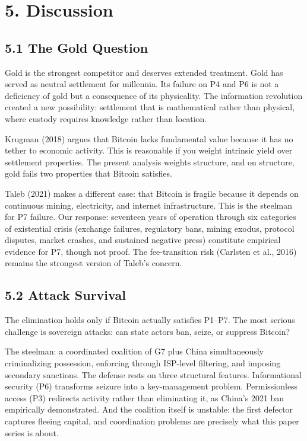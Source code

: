 \documentclass[12pt]{article}
\theoremstyle{definition}
\theoremstyle{remark}
\begin{document}
\section{5. Discussion}

\subsection{5.1 The Gold Question}

Gold is the strongest competitor and deserves extended treatment. Gold
has served as neutral settlement for millennia. Its failure on P4 and P6
is not a deficiency of gold but a consequence of its physicality. The
information revolution created a new possibility: settlement that is
mathematical rather than physical, where custody requires knowledge
rather than location.

Krugman (2018) argues that Bitcoin lacks fundamental value because it
has no tether to economic activity. This is reasonable if you weight
intrinsic yield over settlement properties. The present analysis
weights structure, and on structure, gold fails two properties that
Bitcoin satisfies.

Taleb (2021) makes a different case: that Bitcoin is fragile because it
depends on continuous mining, electricity, and internet infrastructure.
This is the steelman for P7 failure. Our response: seventeen years of
operation through six categories of existential crisis (exchange
failures, regulatory bans, mining exodus, protocol disputes, market
crashes, and sustained negative press) constitute empirical evidence for
P7, though not proof. The fee-transition risk (Carlsten et al., 2016)
remains the strongest version of Taleb's concern.

\subsection{5.2 Attack Survival}

The elimination holds only if Bitcoin actually satisfies P1--P7. The most
serious challenge is sovereign attacks: can state actors ban, seize, or
suppress Bitcoin?

The steelman: a coordinated coalition of G7 plus China simultaneously
criminalizing possession, enforcing through ISP-level filtering, and
imposing secondary sanctions. The defense rests on three structural
features. Informational security (P6) transforms seizure into a
key-management problem. Permissionless access (P3) redirects activity
rather than eliminating it, as China's 2021 ban empirically
demonstrated. And the coalition itself is unstable: the first defector
captures fleeing capital, and coordination problems are precisely what
this paper series is about.
\end{document}
